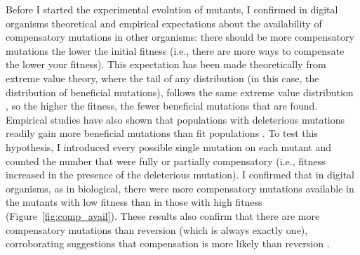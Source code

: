 \begin{doublespace}
Before I started the experimental evolution of mutants,
I confirmed in digital organisms theoretical and empirical expectations
about the availability of compensatory mutations in other organisms:
there should be more compensatory mutations the lower the initial fitness
(i.e., there are more ways to compensate the lower your fitness).
%
This expectation has been made theoretically from extreme value theory,
where the tail of any distribution
(in this case, the distribution of beneficial mutations),
follows the same extreme value distribution \citep{orr02},
so the higher the fitness, the fewer beneficial mutations that are found.
%
Empirical studies \citep[e.g.,][]{ele98,bur99} have also shown
that populations with deleterious mutations readily gain
more beneficial mutations than fit populations \citep{whi00}.
%
To test this hypothesis, I introduced every possible single mutation
on each mutant and counted the number that were fully or partially compensatory
(i.e., fitness increased in the presence of the deleterious mutation).
%
I confirmed that in digital organisms, as in biological,
there were more compensatory mutations available in the mutants
with low fitness than in those with high fitness (Figure~\ref{fig:comp_avail}).
%
These results also confirm that there are more compensatory mutations
than reversion (which is always exactly one),
corroborating suggestions that compensation is more likely than reversion
\citep{mai02}.




\end{doublespace}

